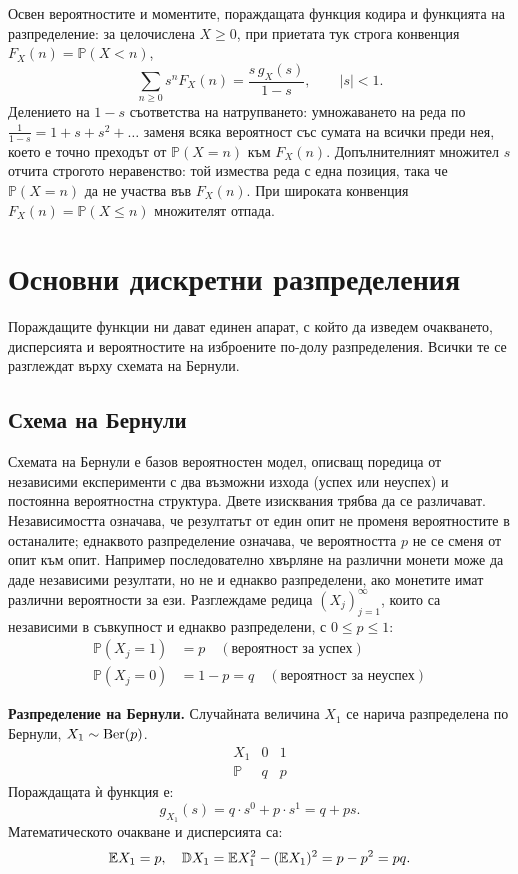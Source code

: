 \begin{supp}\label{supp:pgf-cdf}
Освен вероятностите и моментите, пораждащата функция кодира и функцията на разпределение:
за целочислена $X \ge 0$, при приетата тук строга конвенция $F_X(n) = \mathbb{P}(X < n)$,
\[ \sum_{n \ge 0} s^n F_X(n) = \frac{s\, g_X(s)}{1-s}, \qquad |s| < 1 . \]
Делението на $1-s$ съответства на натрупването: умножаването на реда по
$\frac{1}{1-s} = 1 + s + s^2 + \dots$ заменя всяка вероятност със сумата на всички преди
нея, което е точно преходът от $\mathbb{P}(X=n)$ към $F_X(n)$. Допълнителният множител
$s$ отчита строгото неравенство: той измества реда с една позиция, така че $\mathbb{P}(X=n)$
да не участва във $F_X(n)$. При широката конвенция $F_X(n) = \mathbb{P}(X \le n)$ множителят
отпада.
\end{supp}

\section{Основни дискретни разпределения}

Пораждащите функции ни дават единен апарат, с който да изведем очакването, дисперсията и вероятностите на изброените по-долу разпределения. Всички те се разглеждат върху схемата на Бернули.

\subsection{Схема на Бернули}

Схемата на Бернули е базов вероятностен модел, описващ поредица от независими експерименти с два възможни изхода (успех или неуспех) и постоянна вероятностна структура.
Двете изисквания трябва да се различават. Независимостта означава, че резултатът от един опит не променя вероятностите в останалите; еднаквото разпределение означава, че вероятността $p$ не се сменя от опит към опит. Например последователно хвърляне на различни монети може да даде независими резултати, но не и еднакво разпределени, ако монетите имат различни вероятности за ези.
Разглеждаме редица $(X_j)_{j=1}^{\infty}$, които са независими в съвкупност и еднакво разпределени,
с $0\le p\le1$:
\begin{align*}
\mathbb{P}(X_j=1) &= p \quad (\text{вероятност за успех}) \\
\mathbb{P}(X_j=0) &= 1-p = q \quad (\text{вероятност за неуспех})
\end{align*}

\medskip\noindent\textbf{Разпределение на Бернули.}
Случайната величина $X_1$ се нарича разпределена по Бернули, $X_1 \sim \operatorname{Ber}(p)$.
\[
\begin{array}{c|c|c}
X_1 & 0 & 1 \\ \hline
\mathbb{P} & q & p
\end{array}
\]
Пораждащата ѝ функция е:
\[ g_{X_1}(s) = q \cdot s^0 + p \cdot s^1 = q + ps. \]
Математическото очакване и дисперсията са:
\[ \mathbb{E} X_1 = p, \quad \mathbb{D} X_1 = \mathbb{E} X_1^2 - (\mathbb{E} X_1)^2 = p - p^2 = pq. \]

